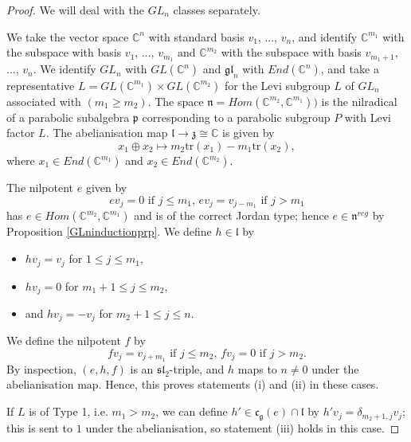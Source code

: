 \documentclass{amsart}
\theoremstyle{remark}
\numberwithin{theorem}{section}
\numberwithin{equation}{section}
\begin{document}
\begin{proof}
We will deal with the $GL_n$ classes separately.

We take the vector space $\mathbb{C}^n$ with standard basis $v_1$, ..., $v_n$, and identify $\mathbb{C}^{m_1}$ with the subspace with basis $v_1$, ..., $v_{m_1}$ and $\mathbb{C}^{m_2}$ with the subspace with basis $v_{m_1+1}$, ..., $v_n$. We identify $GL_n$ with $GL(\mathbb{C}^n)$ and $\mathfrak{gl}_n$ with $End(\mathbb{C}^n)$, and take a representative $L = GL(\mathbb{C}^{m_1}) \times GL(\mathbb{C}^{m_2})$ for the Levi subgroup $L$ of $GL_n$ associated with $(m_1 \geq m_2)$. The space $\mathfrak{n} = Hom(\mathbb{C}^{m_2},\mathbb{C}^{m_1}))$ is the nilradical of a parabolic subalgebra $\mathfrak{p}$ corresponding to a parabolic subgroup $P$ with Levi factor $L$. The abelianisation map $\mathfrak{l} \rightarrow \mathfrak{z} \cong \mathbb{C}$ is given by
$$x_1\oplus x_2 \mapsto m_2\text{tr}(x_1) - m_1\text{tr}(x_2),$$
where $x_1 \in End(\mathbb{C}^{m_1})$ and $x_2 \in End(\mathbb{C}^{m_2})$.

The nilpotent $e$ given by
    $$ev_j = 0 \text{ if } j \leq m_1, \, ev_j = v_{j-m_1} \text{ if } j >m_1$$
has $e \in Hom(\mathbb{C}^{m_2},\mathbb{C}^{m_1})$ and is of the correct Jordan type; hence $e \in \mathfrak{n}^{reg}$ by Proposition \ref{GLninductionprp}. We define $h \in \mathfrak{l}$ by
\begin{itemize}
    \item $hv_j = v_j$ for $1 \leq j \leq m_1$,
    \item $hv_j = 0$ for $m_1+1 \leq j \leq m_2$,
    \item and $hv_j = -v_j$ for $m_2+1 \leq j \leq n$.
\end{itemize}
We define the nilpotent $f$ by
$$ fv_j = v_{j+m_1} \text{ if } j \leq m_2, \, fv_j = 0 \text{ if } j >m_2. $$
By inspection, $(e,h,f)$ is an $\mathfrak{sl}_2$-triple, and $h$ maps to $n \neq 0$ under the abelianisation map. Hence, this proves statements (i) and (ii) in these cases.

If $L$ is of Type 1, i.e. $m_1 > m_2$, we can define $h' \in \mathfrak{c}_{\mathfrak{g}}(e) \cap \mathfrak{l}$ by $h'v_j = \delta_{m_2+1,j}v_j$; this is sent to $1$ under the abelianisation, so statement (iii) holds in this case.


\end{proof}
\end{document}
